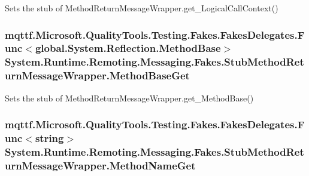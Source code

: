 Sets the stub of Method\-Return\-Message\-Wrapper.\-get\-\_\-\-Logical\-Call\-Context()

\hypertarget{class_system_1_1_runtime_1_1_remoting_1_1_messaging_1_1_fakes_1_1_stub_method_return_message_wrapper_a57d20021d191c20e62f02468a2306b1b}{
\subsubsection[{Method\-Base\-Get}]{\setlength{\rightskip}{0pt plus 5cm}mqttf.\-Microsoft.\-Quality\-Tools.\-Testing.\-Fakes.\-Fakes\-Delegates.\-Func$<$global.\-System.\-Reflection.\-Method\-Base$>$ System.\-Runtime.\-Remoting.\-Messaging.\-Fakes.\-Stub\-Method\-Return\-Message\-Wrapper.\-Method\-Base\-Get}}\label{class_system_1_1_runtime_1_1_remoting_1_1_messaging_1_1_fakes_1_1_stub_method_return_message_wrapper_a57d20021d191c20e62f02468a2306b1b}


Sets the stub of Method\-Return\-Message\-Wrapper.\-get\-\_\-\-Method\-Base()

\hypertarget{class_system_1_1_runtime_1_1_remoting_1_1_messaging_1_1_fakes_1_1_stub_method_return_message_wrapper_a99ecb17876602171236a1100f9329a80}{
\subsubsection[{Method\-Name\-Get}]{\setlength{\rightskip}{0pt plus 5cm}mqttf.\-Microsoft.\-Quality\-Tools.\-Testing.\-Fakes.\-Fakes\-Delegates.\-Func$<$string$>$ System.\-Runtime.\-Remoting.\-Messaging.\-Fakes.\-Stub\-Method\-Return\-Message\-Wrapper.\-Method\-Name\-Get}}\label{class_system_1_1_runtime_1_1_remoting_1_1_messaging_1_1_fakes_1_1_stub_method_return_message_wrapper_a99ecb17876602171236a1100f9329a80}


